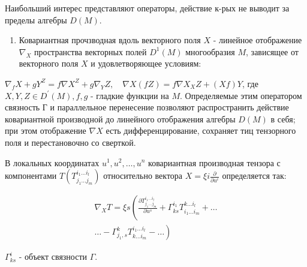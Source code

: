 \documentclass[10pt]{article}
\begin{document}
Наибольший интерес представляют операторы, действие к-рых не выводит за пределы алгебры $D(M)$.



\begin{enumerate}

  \item Ковариантная прочзводная вдоль векторного поля $X$ - линейное отображение $\nabla_{X}$ пространства векторных полей $D^{1}(M)$ многообразия $M$, зависящее от векторного поля $X$ и удовлетворяющее условиям:

\end{enumerate}



$\nabla_{f} X+g Y^{Z}=f \nabla X^{Z}+g \nabla_{Y} Z, \quad \nabla X(f Z)=f \nabla X_{X} Z+(X f) Y$, где $X, Y, Z \in D^{\prime}(M), f, g$ - гладкие функции на $M$. Определяемые этим оператором связность Г и параллельное перенесение позволяют распространить действие ковариантной производной до линейного отображения алгебры $D(M)$ в себя; при этом отображение $\nabla X$ есть дифференцирование, сохраняет тиц тензорного поля и перестановочно со сверткой.



В локальных координатах $u^{1}, u^{2}, \ldots, u^{n}$ ковариантная производная тензора с компонентами $T\left(T_{j_{1} \ldots j_{m}}^{i_{1} \ldots i_{l}}\right)$ относительно вектора $X=\xi i \frac{\partial}{\partial u^{i}}$ определяется так:



\[

\begin{gathered}

\nabla_{X} T=\xi s\left(\frac{\partial T_{j_{1} \ldots j_{m}}^{i_{1} \ldots i_{l}}}{\partial u^{s}}+\Gamma_{k s}^{i_{1}} T_{i_{1} \ldots i_{m}}^{k \ldots i_{l}}+\ldots\right. \\

\left.\ldots-\Gamma_{j_{1}, s}^{k} T_{k \ldots i_{m}}^{i_{1} \ldots i_{l}}-\ldots\right)

\end{gathered}

\]



$\Gamma_{k s}^{i}$ - объект связности $\Gamma$.
\end{document}
